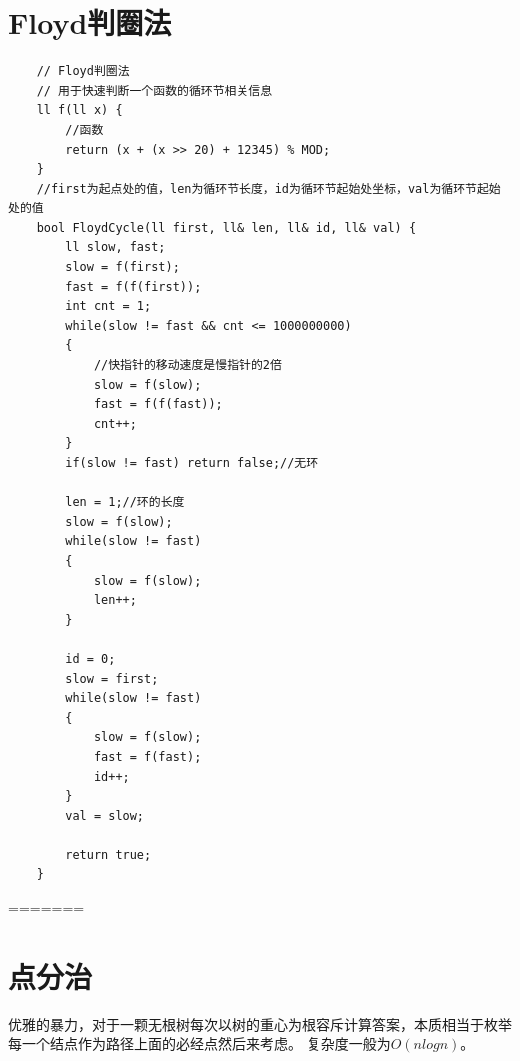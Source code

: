 \documentclass[a4paper,11pt,twoside,fontset = fandol,UTF8]{ctexbook} %
\begin{document}
	\section{Floyd判圈法}
	\begin{lstlisting}
	// Floyd判圈法
	// 用于快速判断一个函数的循环节相关信息
	ll f(ll x) {
	    //函数
	    return (x + (x >> 20) + 12345) % MOD;
	}
	//first为起点处的值，len为循环节长度，id为循环节起始处坐标，val为循环节起始处的值
	bool FloydCycle(ll first, ll& len, ll& id, ll& val) {
	    ll slow, fast;
	    slow = f(first);
	    fast = f(f(first));
	    int cnt = 1;
	    while(slow != fast && cnt <= 1000000000)
	    {
	        //快指针的移动速度是慢指针的2倍
	        slow = f(slow);
	        fast = f(f(fast));
	        cnt++;
	    }
	    if(slow != fast) return false;//无环
	
	    len = 1;//环的长度
	    slow = f(slow);
	    while(slow != fast)
	    {
	        slow = f(slow);
	        len++;
	    }
	
	    id = 0;
	    slow = first;
	    while(slow != fast)
	    {
	        slow = f(slow);
	        fast = f(fast);
	        id++;
	    }
	    val = slow;
	
	    return true;   
	} 
	\end{lstlisting}
	
=======
	\section{点分治}
	优雅的暴力，对于一颗无根树每次以树的重心为根容斥计算答案，本质相当于枚举每一个结点作为路径上面的必经点然后来考虑。
	复杂度一般为$O(nlogn)$。
	
\end{document}
